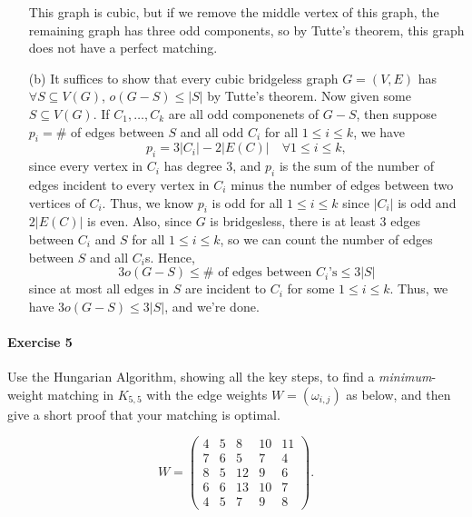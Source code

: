 \documentclass[a4paper,12pt]{article}
\begin{document}
\begin{itemize}
\begin{figure}[H]
	\end{figure}
	This graph is cubic, but if we remove the middle vertex of this graph, the remaining graph has three odd components, so by Tutte's theorem, this graph does not have a perfect matching.
	\item [(b)] It suffices to show that every cubic bridgeless graph \(G=(V,E)\) has \(\forall S \subseteq V(G)\), \(o(G - S) \le \vert S \vert \) by Tutte's theorem. Now given some \(S \subseteq V(G)\). If \(C_1, \dots , C_k\) are all odd componenets of \(G - S\), then suppose \(p_i = \# \) of edges between \(S\) and all odd \(C_i\) for all \(1 \le i \le k\), we have 
	\[
		p_i = 3 \vert C_i \vert - 2 \vert E(C) \vert \quad \forall 1 \le i \le k,  
	\]
	since every vertex in \(C_i\) has degree 3, and \(p_i\) is the sum of the number of edges incident to every vertex in \(C_i\) minus the number of edges between two vertices of \(C_i\). Thus, we know \(p_i\) is odd for all \(1 \le i \le k\) since \(\vert C_i \vert \) is odd and \(2 \vert E(C) \vert \) is even. Also, since \(G\)  is bridgesless, there is at least 3 edges between \(C_i\) and \(S\) for all \(1 \le i \le k\), so we can count the number of edges between \(S\) and all \(C_i\)s. Hence,
	\[
		3 o(G - S) \le \# \text{ of edges between } C_i \text{'s} \le 3 \vert S \vert      
	\]            
	since at most all edges in \(S\) are incident to \(C_i\) for some \(1 \le i \le k\). Thus, we have \(3 o(G - S) \le 3 \vert S \vert \), and we're done.     
\end{itemize}

\paragraph{Exercise 5} Use the Hungarian Algorithm, showing all the key steps, to find a \emph{minimum}-weight matching in $K_{5,5}$ with the edge weights $W = \left( \omega_{i,j} \right)$ as below, and then give a short proof that your matching is optimal.

\[ W = \begin{pmatrix}
	4 & 5 & 8 & 10 & 11 \\
	7 & 6 & 5 & 7 & 4 \\
	8 & 5 & 12 & 9 & 6 \\
	6 & 6 & 13 & 10 & 7 \\
	4 & 5 & 7 & 9 & 8
\end{pmatrix} . \]
\end{document}
